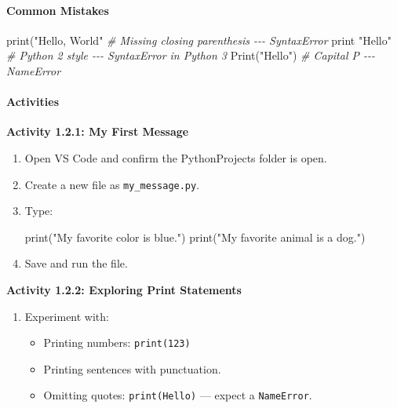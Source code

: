\documentclass[
  justified,
  openright,
]{tufte-book}
\let\subsection\paragraph
\let\paragraph\paragraph
\newcommand{\StringTok}[1]{\textcolor{CodeString}{#1}}              %
\newcommand{\CommentTok}[1]{\textcolor{CodeComment}{\textit{#1}}}  %
\newenvironment{Shaded}{%
  \begin{mdframed}[style=TufteCode]%
}{%
  \end{mdframed}%
}
\let\subsection\paragraph
\let\paragraph\paragraph
\providecommand{\tightlist}{%
  \setlength{\itemsep}{0pt}\setlength{\parskip}{0pt}}
\begin{document}
\subsection{Common Mistakes}\label{common-mistakes}

\begin{Shaded}
\begin{Highlighting}[]
print(\StringTok{"Hello, World"}        \CommentTok{\# Missing closing parenthesis {-}{-}{-} SyntaxError}
print \StringTok{"Hello"}               \CommentTok{\# Python 2 style {-}{-}{-} SyntaxError in Python 3}
Print(\StringTok{"Hello"})              \CommentTok{\# Capital P {-}{-}{-} NameError}
\end{Highlighting}
\end{Shaded}

\subsection{Activities}\label{activities-1}

\textbf{Activity 1.2.1: My First Message}

\begin{enumerate}
\def\labelenumi{\arabic{enumi}.}
\item
  Open VS Code and confirm the PythonProjects folder is open.
\item
  Create a new file as \texttt{my\_message.py}.
\item
  Type:

\begin{Shaded}
\begin{Highlighting}[]
print(\StringTok{"My favorite color is blue."})
print(\StringTok{"My favorite animal is a dog."})
\end{Highlighting}
\end{Shaded}
\item
  Save and run the file.
\end{enumerate}

\textbf{Activity 1.2.2: Exploring Print Statements}

\begin{enumerate}
\def\labelenumi{\arabic{enumi}.}
\tightlist
\item
  Experiment with:

  \begin{itemize}
  \tightlist
  \item
    Printing numbers: \texttt{print(123)}
  \item
    Printing sentences with punctuation.
  \item
    Omitting quotes: \texttt{print(Hello)} --- expect a
    \texttt{NameError}.
  \end{itemize}
\end{enumerate}
\end{document}
